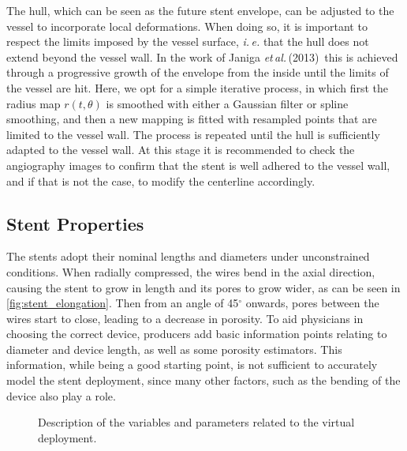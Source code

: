 The hull, which can be seen as the future stent envelope, can be adjusted to the vessel to incorporate local deformations. When doing so, it is important to respect the limits imposed by the vessel surface, \textit{i.\,e.} that the hull does not extend beyond the vessel wall. In the work of Janiga \textit{et\,al.}\,(2013)\,\cite{Janiga2013} this is achieved through a progressive growth of the envelope from the inside until the limits of the vessel are hit. Here, we opt for a simple iterative process, in which first the radius map $r(t, \theta)$ is smoothed with either a Gaussian filter or spline smoothing, and then a new mapping is fitted with resampled points that are limited to the vessel wall. The process is repeated until the hull is sufficiently adapted to the vessel wall. At this stage it is recommended to check the angiography images to confirm that the stent is well adhered to the vessel wall, and if that is not the case, to modify the centerline accordingly.

\subsection{Stent Properties}
The stents adopt their nominal lengths and diameters under unconstrained conditions. When radially compressed, the wires bend in the axial direction, causing the stent to grow in length and its pores to grow wider, as can be seen in \autoref{fig:stent_elongation}. Then from an angle of 45$^\circ$ onwards, pores between the wires start to close, leading to a decrease in porosity. To aid physicians in choosing the correct device, producers add basic information points relating to diameter and device length, as well as some porosity estimators. This information, while being a good starting point, is not sufficient to accurately model the stent deployment, since many other factors, such as the bending of the device also play a role.
\begin{figure}[htb]
	\centering
	\begin{minipage}[b]{.46\textwidth}
		\centering
		
		\vspace*{-0.6cm}
		\caption[Stent elongation]{Elongation of a PED (3.25\,$\times$\,20\,mm) under radial compression.}\label{fig:stent_elongation}
	\end{minipage}%
	\hfill
	\begin{minipage}[b]{.51\textwidth}
		\centering
		
		\vspace*{-0.6cm}
		\caption[Scheme of a bent stent]{Description of the variables and parameters related to the virtual deployment.}\label{fig:StentAnalysis}
	\end{minipage}
\end{figure}

